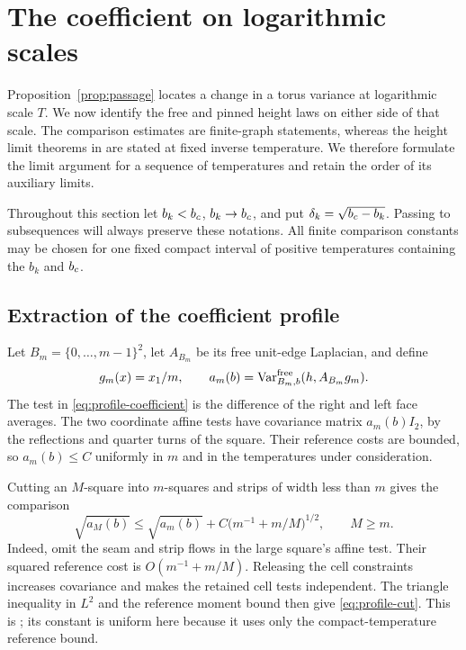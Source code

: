\section{The coefficient on logarithmic scales}\label{sec:profile}

Proposition~\ref{prop:passage} locates a change in a torus variance at
logarithmic scale $T$. We now identify the free and pinned height laws
on either side of that scale. The comparison estimates are finite-graph
statements, whereas the height limit theorems in \cite{X} are stated at
fixed inverse temperature. We therefore formulate the limit argument
for a sequence of temperatures and retain the order of its auxiliary
limits.

Throughout this section let $b_k<b_c$, $b_k\to b_c$, and put
$\delta_k=\sqrt{b_c-b_k}$. Passing to subsequences will always preserve
these notations. All finite comparison constants may be chosen for one
fixed compact interval of positive temperatures containing the $b_k$
and $b_c$.

\subsection{Extraction of the coefficient profile}

Let $B_m=\{0,\ldots,m-1\}^2$, let $A_{B_m}$ be its free unit-edge
Laplacian, and define
\begin{equation}\label{eq:profile-coefficient}
 g_m(x)=x_1/m,\qquad
 a_m(b)=\operatorname{Var}_{B_m,b}^{\mathrm{free}}(h,A_{B_m}g_m).
\end{equation}
The test in \eqref{eq:profile-coefficient} is the difference of the
right and left face averages. The two coordinate affine tests have
covariance matrix $a_m(b)I_2$, by the reflections and quarter turns of
the square. Their reference costs are bounded, so $a_m(b)\le C$
uniformly in $m$ and in the temperatures under consideration.

Cutting an $M$-square into $m$-squares and strips of width less than $m$
gives the comparison
\begin{equation}\label{eq:profile-cut}
 \sqrt{a_M(b)}\le \sqrt{a_m(b)}
       +C\bigl(m^{-1}+m/M\bigr)^{1/2},\qquad M\ge m.
\end{equation}
Indeed, omit the seam and strip flows in the large square's affine
test. Their squared reference cost is $O(m^{-1}+m/M)$. Releasing the
cell constraints increases covariance and makes the retained cell
tests independent. The triangle inequality in $L^2$ and the reference
moment bound then give \eqref{eq:profile-cut}. This is \cite[Equation~(2.6)]{X}; its constant is uniform here because it uses only the
compact-temperature reference bound.

